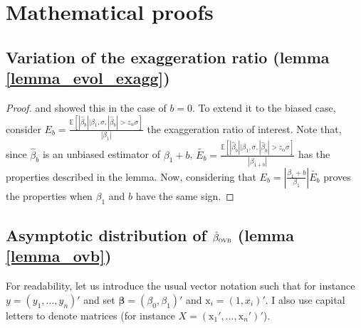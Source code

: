 \documentclass[usletter, 12pt]{article}
\begin{document}
	
\newpage
	



\newpage

\appendix

	\section{Mathematical proofs}\label{maths_proofs}
	

		\subsection{Variation of the exaggeration ratio (lemma \ref{lemma_evol_exagg})}
			
			\begin{proof}
				\cite{lu_note_2019} and \cite{zwet_significance_2021} showed this in the case of $b = 0$. 
				To extend it to the biased case, consider 
				$E_{b} = \frac{\mathbb{E}\left[ |\hat{\beta}_{b}| \big| \beta_{1}, \sigma, |\hat{\beta}_{b}| > z_{\alpha} \sigma \right]}{|\beta_{1}|}$ the exaggeration ratio of interest. 
				Note that, since $\hat{\beta}_{b}$ is an unbiased estimator of $\beta_{1} + b$, $\tilde{E_{b}} = \frac{\mathbb{E}\left[ |\hat{\beta}_{b}| \big| \beta_{1}, \sigma, |\hat{\beta}_{b}| > z_{\alpha} \sigma \right]}{|\beta_{1 + b}|}$ has the properties described in the lemma. 
				Now, considering that $E_{b} = \left| \frac{\beta_{1} + b}{\beta_{1}} \right| \tilde{E_{b}}$ proves the properties when $\beta_{1}$ and $b$ have the same sign.
			\end{proof}
	

\subsection{Asymptotic distribution of $\hat{\beta}_{\textsc{ovb}}$ (lemma \ref{lemma_ovb})}
			
			For readability, let us introduce the usual vector notation such that for instance $y = (y_1, ..., y_n)'$ and set $\bm{\beta} = (\beta_0, \beta_1)'$ and $\text{x}_i = (1, x_i)'$. I also use capital letters to denote matrices (for instance $X = (\text{x}_{1}', ..., \text{x}_{n}')'$).\\
			
\end{document}
